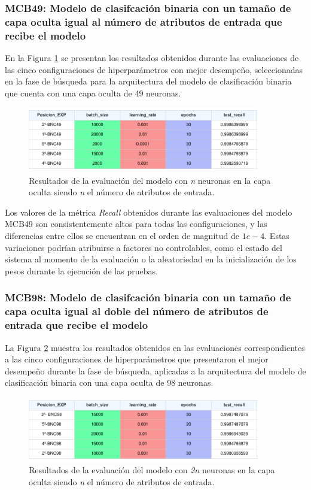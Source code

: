 \subsubsection{MCB49: Modelo de clasifcación binaria con un tamaño de capa oculta igual al número de atributos de entrada que recibe el modelo}
En la Figura \ref{fig:EVALMCB49} se presentan los resultados obtenidos durante las evaluaciones de las cinco configuraciones de hiperparámetros con mejor desempeño, seleccionadas en la fase de búsqueda para la arquitectura del modelo de clasificación binaria que cuenta con una capa oculta de 49 neuronas.

\begin{figure}[H]
    \centering
    \includegraphics[width=0.9\textwidth]{./img/evaluacion/EVALMCB49.pdf}
    \caption{Resultados de la evaluación del modelo con \textit{n} neuronas en la capa oculta siendo \textit{n} el número de atributos de entrada.}
    \label{fig:EVALMCB49}
\end{figure}

Los valores de la métrica \textit{Recall} obtenidos durante las evaluaciones del modelo MCB49 son consistentemente altos para todas las configuraciones, y las diferencias entre ellos se encuentran en el orden de magnitud de $1e-4$. Estas variaciones podrían atribuirse a factores no controlables, como el estado del sistema al momento de la evaluación o la aleatoriedad en la inicialización de los pesos durante la ejecución de las pruebas.

\subsubsection{MCB98: Modelo de clasifcación binaria con un tamaño de capa oculta igual al doble del número de atributos de entrada que recibe el modelo}
La Figura \ref{fig:EVALMCB98} muestra los resultados obtenidos en las evaluaciones correspondientes a las cinco configuraciones de hiperparámetros que presentaron el mejor desempeño durante la fase de búsqueda, aplicadas a la arquitectura del modelo de clasificación binaria con una capa oculta de 98 neuronas.

\begin{figure}[H]
    \centering
    \includegraphics[width=0.9\textwidth]{./img/evaluacion/EVALMCB98.pdf}
    \caption{Resultados de la evaluación del modelo con \textit{2n} neuronas en la capa oculta siendo \textit{n} el número de atributos de entrada.}
    \label{fig:EVALMCB98}
\end{figure}

